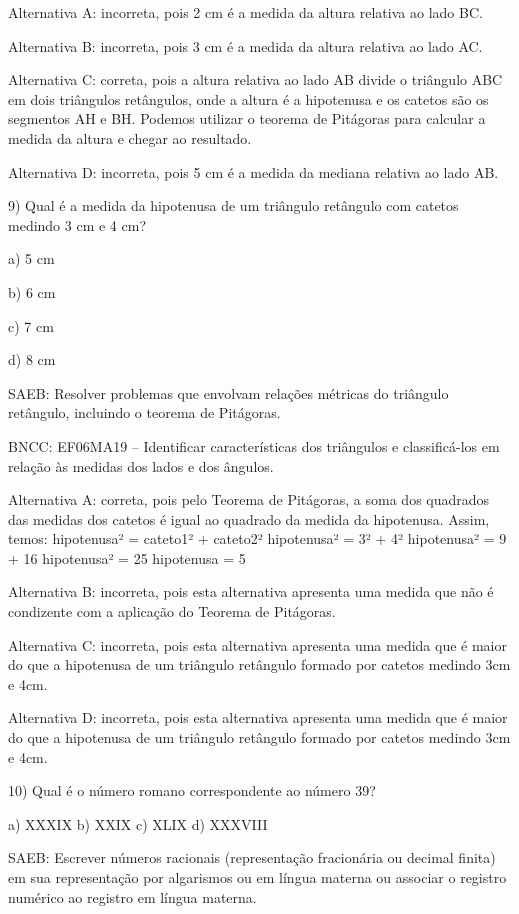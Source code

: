 Alternativa A: incorreta, pois 2 cm é a medida da altura relativa ao
lado BC.

Alternativa B: incorreta, pois 3 cm é a medida da altura relativa ao
lado AC.

Alternativa C: correta, pois a altura relativa ao lado AB divide o
triângulo ABC em dois triângulos retângulos, onde a altura é a
hipotenusa e os catetos são os segmentos AH e BH. Podemos utilizar o
teorema de Pitágoras para calcular a medida da altura e chegar ao
resultado.

Alternativa D: incorreta, pois 5 cm é a medida da mediana relativa ao
lado AB.

9) Qual é a medida da hipotenusa de um triângulo retângulo com catetos
medindo 3 cm e 4 cm?

a) 5 cm

b) 6 cm

c) 7 cm

d) 8 cm

SAEB: Resolver problemas que envolvam relações métricas do triângulo
retângulo, incluindo o teorema de Pitágoras.

BNCC: EF06MA19 -- Identificar características dos triângulos e
classificá-los em relação às medidas dos lados e dos ângulos.

Alternativa A: correta, pois pelo Teorema de Pitágoras, a soma dos
quadrados das medidas dos catetos é igual ao quadrado da medida da
hipotenusa. Assim, temos: hipotenusa² = cateto1² + cateto2² hipotenusa²
= 3² + 4² hipotenusa² = 9 + 16 hipotenusa² = 25 hipotenusa = 5

Alternativa B: incorreta, pois esta alternativa apresenta uma medida que
não é condizente com a aplicação do Teorema de Pitágoras.

Alternativa C: incorreta, pois esta alternativa apresenta uma medida que
é maior do que a hipotenusa de um triângulo retângulo formado por
catetos medindo 3cm e 4cm.

Alternativa D: incorreta, pois esta alternativa apresenta uma medida que
é maior do que a hipotenusa de um triângulo retângulo formado por
catetos medindo 3cm e 4cm.

10) Qual é o número romano correspondente ao número 39?

a) XXXIX b) XXIX c) XLIX d) XXXVIII

SAEB: Escrever números racionais (representação fracionária ou decimal
finita) em sua representação por algarismos ou em língua materna ou
associar o registro numérico ao registro em língua materna.

